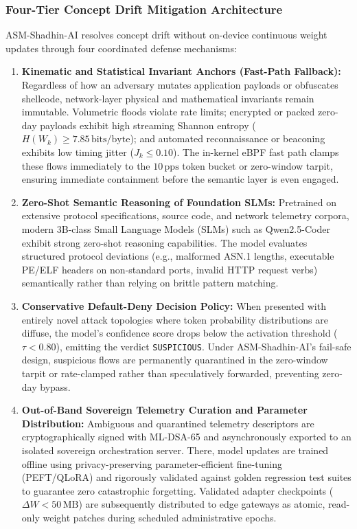 \documentclass{ieeeaccess}
\renewcommand{\_}{\textunderscore\allowbreak}
\begin{document}
\subsubsection{Four-Tier Concept Drift Mitigation Architecture}
ASM-Shadhin-AI resolves concept drift without on-device continuous weight updates through four coordinated defense mechanisms:
\begin{enumerate}
  \item \textbf{Kinematic and Statistical Invariant Anchors (Fast-Path Fallback):} Regardless of how an adversary mutates application payloads or obfuscates shellcode, network-layer physical and mathematical invariants remain immutable. Volumetric floods violate rate limits; encrypted or packed zero-day payloads exhibit high streaming Shannon entropy ($H(W_k) \ge 7.85\,\text{bits/byte}$); and automated reconnaissance or beaconing exhibits low timing jitter ($J_k \le 0.10$). The in-kernel eBPF fast path clamps these flows immediately to the $10\,\text{pps}$ token bucket or zero-window tarpit, ensuring immediate containment before the semantic layer is even engaged.
  \item \textbf{Zero-Shot Semantic Reasoning of Foundation SLMs:} Pretrained on extensive protocol specifications, source code, and network telemetry corpora, modern 3B-class Small Language Models (SLMs) such as Qwen2.5-Coder exhibit strong zero-shot reasoning capabilities. The model evaluates structured protocol deviations (e.g., malformed ASN.1 lengths, executable PE/ELF headers on non-standard ports, invalid HTTP request verbs) semantically rather than relying on brittle pattern matching.
  \item \textbf{Conservative Default-Deny Decision Policy:} When presented with entirely novel attack topologies where token probability distributions are diffuse, the model's confidence score drops below the activation threshold ($\tau < 0.80$), emitting the verdict \texttt{SUSPICIOUS}. Under ASM-Shadhin-AI's fail-safe design, suspicious flows are permanently quarantined in the zero-window tarpit or rate-clamped rather than speculatively forwarded, preventing zero-day bypass.
  \item \textbf{Out-of-Band Sovereign Telemetry Curation and Parameter Distribution:} Ambiguous and quarantined telemetry descriptors are cryptographically signed with ML-DSA-65 and asynchronously exported to an isolated sovereign orchestration server. There, model updates are trained offline using privacy-preserving parameter-efficient fine-tuning (PEFT/QLoRA) and rigorously validated against golden regression test suites to guarantee zero catastrophic forgetting. Validated adapter checkpoints ($\Delta W < 50\,\text{MB}$) are subsequently distributed to edge gateways as atomic, read-only weight patches during scheduled administrative epochs.
\end{enumerate}
\end{document}
